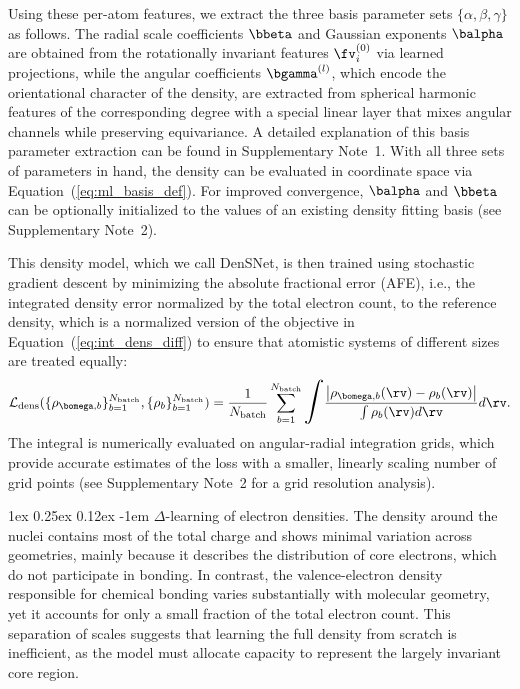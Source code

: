 \documentclass[12pt]{article}
\makeatletter
\renewcommand\paragraph{\@startsection{paragraph}{4}{\parindent}%
  {1ex \@plus 0.25ex \@minus 0.12ex}%
  {-1em}%
  {\normalfont\normalsize\itshape}}
\makeatother
\begin{document}
Using these per-atom features, we extract the three basis parameter sets $\{\alpha,\beta,\gamma\}$ as follows.
The radial scale coefficients $\bbeta$ and Gaussian exponents $\balpha$ are
obtained from the rotationally invariant features $\fv_i^{(0)}$ via learned
projections, while the angular coefficients $\bgamma^{(l)}$, which encode the orientational
character of the density, are extracted from spherical harmonic features of the corresponding degree with a special linear layer that mixes angular channels while preserving equivariance. A detailed explanation of this basis parameter extraction can be found in Supplementary Note~1.
With all three sets of parameters in hand, the density can be evaluated in coordinate space via Equation~(\ref{eq:ml_basis_def}). 
For improved convergence, $\balpha$ and $\bbeta$ can be optionally initialized to the values of an existing density fitting basis (see Supplementary Note~2).

This density model, which we call DenSNet, is then trained using stochastic gradient descent by minimizing the absolute fractional error (AFE), i.e., the integrated density error normalized by the total electron count, to the reference density, which is a normalized version of the objective in Equation~(\ref{eq:int_dens_diff}) to ensure that atomistic systems of different sizes are treated equally:
\begin{equation}\label{eq:perc_dens_diff}
  \mathcal{L}_{\mathrm{dens}}(\{\rho_{\bomega,b}\}_{b=1}^{N_{\mathrm{batch}}},\{\rho_b\}_{b=1}^{N_{\mathrm{batch}}}) = \frac{1}{N_{\mathrm{batch}}}\sum_{b=1}^{N_{\mathrm{batch}}}\scaleobj{1.5}{\int} \frac{\left|\rho_{\bomega,b}(\rv) - \rho_b(\rv)\right|}{\int\rho_b(\rv)d\rv}d\rv.
\end{equation}
The integral is numerically evaluated on angular-radial integration grids, which provide accurate estimates of the loss with a smaller, linearly scaling number of grid points (see Supplementary Note~2 for a grid resolution analysis). 

\paragraph{$\Delta$-learning of electron densities.}\label{sec:delta-learning}
The density around the nuclei contains most of the total charge and shows minimal variation across geometries, mainly because it describes the distribution of core electrons, which do not participate in bonding. In contrast, the valence-electron density responsible for chemical bonding varies substantially with molecular geometry, yet it accounts for only a small fraction of the total electron count. This separation of scales suggests that learning the full density from scratch is inefficient, as the model must allocate capacity to represent the largely invariant core region.
\end{document}
